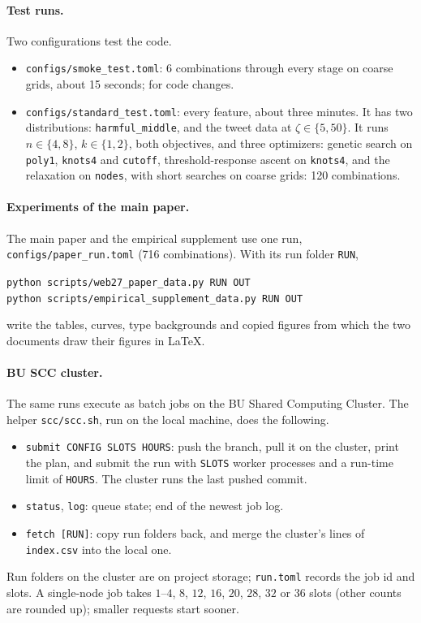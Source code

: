 \documentclass[11pt]{article}
\newcommand{\code}[1]{\texttt{#1}}
\begin{document}
\paragraph{Test runs.} Two configurations test the code.
\begin{itemize}
    \item \code{configs/smoke\_test.toml}: 6 combinations through every stage on coarse grids, about 15 seconds; for code changes.
    \item \code{configs/standard\_test.toml}: every feature, about three minutes. It has two distributions: \code{harmful\_middle}, and the tweet data at $\zeta\in\{5,50\}$. It runs $n\in\{4,8\}$, $k\in\{1,2\}$, both objectives, and three optimizers: genetic search on \code{poly1}, \code{knots4} and \code{cutoff}, threshold-response ascent on \code{knots4}, and the relaxation on \code{nodes}, with short searches on coarse grids: 120 combinations.
\end{itemize}

\paragraph{Experiments of the main paper.} The main paper and the empirical supplement use one run, \code{configs/paper\_run.toml} (716 combinations). With its run folder \code{RUN},
\begin{center}
\code{python scripts/web27\_paper\_data.py RUN OUT}\\
\code{python scripts/empirical\_supplement\_data.py RUN OUT}
\end{center}
write the tables, curves, type backgrounds and copied figures from which the two documents draw their figures in \LaTeX.

\paragraph{BU SCC cluster.} The same runs execute as batch jobs on the BU Shared Computing Cluster. The helper \code{scc/scc.sh}, run on the local machine, does the following.
\begin{itemize}
    \item \code{submit CONFIG SLOTS HOURS}: push the branch, pull it on the cluster, print the plan, and submit the run with \code{SLOTS} worker processes and a run-time limit of \code{HOURS}. The cluster runs the last pushed commit.
    \item \code{status}, \code{log}: queue state; end of the newest job log.
    \item \code{fetch [RUN]}: copy run folders back, and merge the cluster's lines of \code{index.csv} into the local one.
\end{itemize}
Run folders on the cluster are on project storage; \code{run.toml} records the job id and slots. A single-node job takes $1$--$4$, $8$, $12$, $16$, $20$, $28$, $32$ or $36$ slots (other counts are rounded up); smaller requests start sooner.
\end{document}
